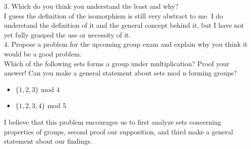 \documentclass{article}
\begin{document}
\newpage

3. Which do you think you understand the least and why? \\

I guess the definition of the isomorphism is still very abstract to me. I do understand the definition of it and the general concept behind it, but I have not yet fully grasped the use or necessity of it. \\ 

4. Propose a problem for the upcoming group exam and explain why you think it would be a good problem.\\

Which of the following sets forms a group under multiplication? Proof your answer! Can you make a general statement about sets mod n forming groups?\\
\begin{itemize}
    \item $\{1, 2, 3\}$ mod 4
    \item $\{1, 2, 3, 4\}$ mod 5
\end{itemize}

I believe that this problem encourages us to first analyze sets concerning properties of groups, second proof our supposition, and third make a general statement about our findings. 
\end{document}
